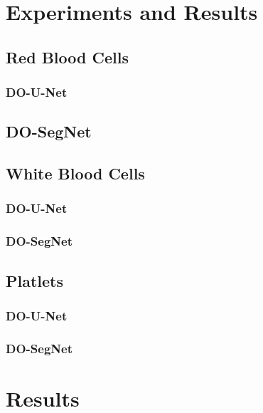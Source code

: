 \section{Experiments and Results}

\subsection{Red Blood Cells}
\subsubsection{DO-U-Net}

\subsection{DO-SegNet}

\subsection{White Blood Cells}
\subsubsection{DO-U-Net}
\subsubsection{DO-SegNet}


\subsection{Platlets}
\subsubsection{DO-U-Net}
\subsubsection{DO-SegNet}


\section{Results}
\vspace{0.2in}
\hspace*{0.16in}



